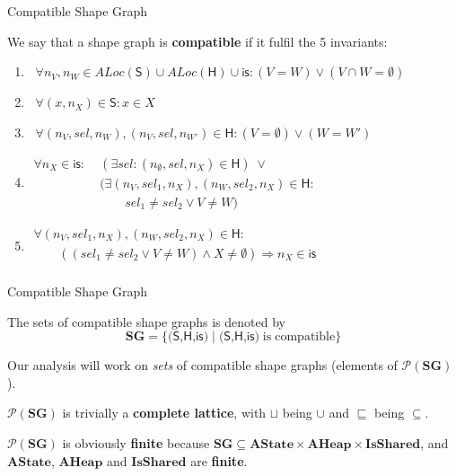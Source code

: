 \documentclass[xcolor=svgnames,11pt]{beamer}
\begin{document}
\begin{frame}{Compatible Shape Graph}

We say that a shape graph is \textbf{compatible} if it fulfil the 5 invariants: \\
\begin{footnotesize}
\begin{enumerate}

\item $ \;\;\forall n_V, n_W \in ALoc(\textsf{S}) \cup ALoc(\textsf{H}) \cup \textsf{is} : (V = W) \vee (V \cap W = \emptyset) $

\item $ \;\;\forall (x, n_X) \in \textsf{S} : x \in X $

\item $ \;\;\forall (n_V,sel,n_W),(n_V,sel,n_{W'}) \in \textsf{H} : (V = \emptyset) \vee (W = W') $

\item $\begin{array}{ll}
\forall n_X \in \textsf{is}: & \;(\exists sel : (n_\emptyset, sel, n_X) \in \textsf{H}) \;\vee \\
\quad & \;(\exists (n_V, sel_1, n_X), (n_W, sel_2, n_X) \in \textsf{H} : \\
\quad & \;\quad\quad sel_1 \neq sel_2 \vee V \neq W )
\end{array}$

\item $\begin{array}{l}
\forall (n_V, sel_1, n_X), (n_W, sel_2, n_X) \in \textsf{H}: \\
\quad\quad ((sel_1 \neq sel_2 \vee V \neq W) \wedge X \neq \emptyset) \Rightarrow n_X \in \textsf{is} \\
\end{array}$

\end{enumerate}
\end{footnotesize}
\end{frame}

\begin{frame}{Compatible Shape Graph}

The sets of compatible shape graphs is denoted by 
$$ \mathbf{SG} = \{\textsf{(S,H,is)} \;|\; \textsf{(S,H,is)} \mathrm{\;is\;compatible} \} $$

\medskip
\pause

Our analysis will work on \emph{sets} of compatible shape graphs (elements of $\mathcal{P}(\mathbf{SG})$).

\medskip
\pause

$\mathcal{P}(\mathbf{SG})$ is trivially a \textbf{complete lattice}, with $\sqcup$ being $\cup$ and $\sqsubseteq$ being $\subseteq$.

\medskip
\pause

$\mathcal{P}(\mathbf{SG})$ is obviously \textbf{finite} because $\mathbf{SG} \subseteq \mathbf{AState} \times \mathbf{AHeap} \times \mathbf{IsShared}$, and $\mathbf{AState}$, $\mathbf{AHeap}$ and $\mathbf{IsShared}$ are \textbf{finite}.
\end{frame}
\end{document}
